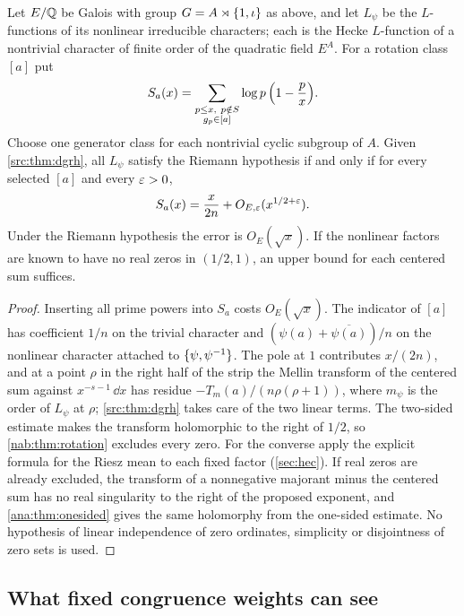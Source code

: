 \begin{corollary}[\stG; \stR]\label{nab:cor:rotation}
Let $E/\mathbb{Q}$ be Galois with group $G=A\rtimes\{1,\iota\}$ as above, and let $L_\psi$ be the
$L$-functions of its nonlinear irreducible characters; each is the Hecke $L$-function of a
nontrivial character of finite order of the quadratic field $E^A$. For a rotation class
$[a]$ put
\[
 S_a(x)=\sum_{\substack{p\le x,\ p\notin S\\g_p\in[a]}}\log p\,\Bigl(1-\frac px\Bigr).
\]
Choose one generator class for each nontrivial cyclic subgroup of $A$. Given
\cref{src:thm:dgrh}, all $L_\psi$ satisfy the Riemann hypothesis if and only if for every
selected $[a]$ and every $\varepsilon>0$,
\[
 S_a(x)=\frac x{2n}+O_{E,\varepsilon}(x^{1/2+\varepsilon}).
\]
Under the Riemann hypothesis the error is $O_E(\sqrt x)$. If the nonlinear factors are
known to have no real zeros in $(1/2,1)$, an upper bound for each centered sum suffices.
\end{corollary}
\begin{proof}
Inserting all prime powers into $S_a$ costs $O_E(\sqrt x)$. The indicator of $[a]$ has
coefficient $1/n$ on the trivial character and $(\psi(a)+\overline{\psi(a)})/n$ on the
nonlinear character attached to $\{\psi,\psi^{-1}\}$. The pole at $1$ contributes
$x/(2n)$, and at a point $\rho$ in the right half of the strip the Mellin transform of the
centered sum against $x^{-s-1}\,\dd x$ has residue $-T_m(a)/(n\rho(\rho+1))$, where $m_\psi$
is the order of $L_\psi$ at $\rho$; \cref{src:thm:dgrh} takes care of the two linear terms.
The two-sided estimate makes the transform holomorphic to the right of $1/2$, so
\cref{nab:thm:rotation} excludes every zero. For the converse apply the explicit formula
for the Riesz mean to each fixed factor (\cref{sec:hec}). If real zeros are already excluded, the transform
of a nonnegative majorant minus the centered sum has no real singularity to the right of
the proposed exponent, and \cref{ana:thm:onesided} gives the same holomorphy from the
one-sided estimate. No hypothesis of linear independence of zero ordinates, simplicity or
disjointness of zero sets is used.
\end{proof}


\subsection{What fixed congruence weights can see}\label{nab:sec:periodic}
\begingroup\raggedright
{}
\endgroup

